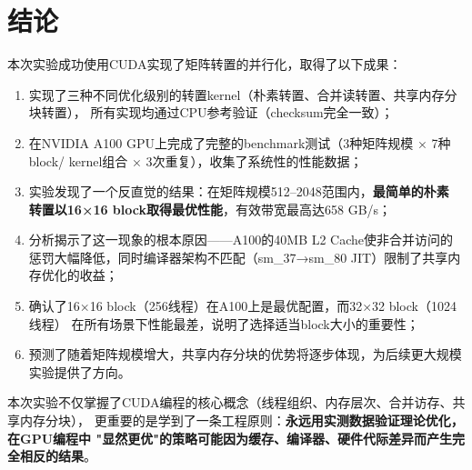 \documentclass[UTF8,a4paper,12pt,fontset=none]{ctexart}
\begin{document}
\section{结论}

本次实验成功使用CUDA实现了矩阵转置的并行化，取得了以下成果：

\begin{enumerate}[leftmargin=2.2em]
  \item 实现了三种不同优化级别的转置kernel（朴素转置、合并读转置、共享内存分块转置），
        所有实现均通过CPU参考验证（checksum完全一致）；
  \item 在NVIDIA A100 GPU上完成了完整的benchmark测试（3种矩阵规模 × 7种block/
        kernel组合 × 3次重复），收集了系统性的性能数据；
  \item 实验发现了一个反直觉的结果：在矩阵规模512--2048范围内，\textbf{最简单的朴素
        转置以16×16 block取得最优性能}，有效带宽最高达658 GB/s；
  \item 分析揭示了这一现象的根本原因——A100的40MB L2 Cache使非合并访问的
        惩罚大幅降低，同时编译器架构不匹配（sm\_37→sm\_80 JIT）限制了共享内存优化的收益；
  \item 确认了16×16 block（256线程）在A100上是最优配置，而32×32 block（1024线程）
        在所有场景下性能最差，说明了选择适当block大小的重要性；
  \item 预测了随着矩阵规模增大，共享内存分块的优势将逐步体现，为后续更大规模
        实验提供了方向。
\end{enumerate}

本次实验不仅掌握了CUDA编程的核心概念（线程组织、内存层次、合并访存、共享内存分块），
更重要的是学到了一条工程原则：\textbf{永远用实测数据验证理论优化，在GPU编程中
"显然更优"的策略可能因为缓存、编译器、硬件代际差异而产生完全相反的结果}。
\end{document}
